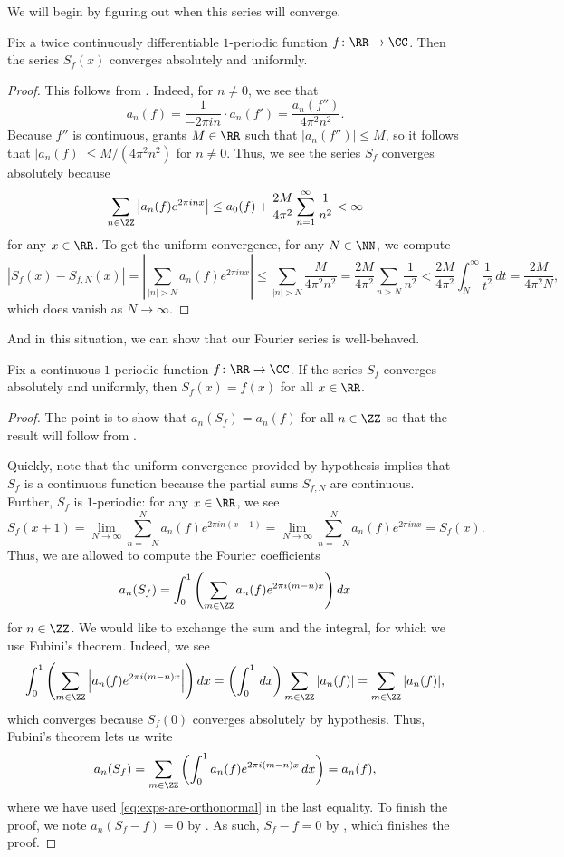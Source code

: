 \documentclass[notes.tex]{subfiles}
\begin{document}
We will begin by figuring out when this series will converge.
\begin{lemma} \label{lem:fourier-series-converges}
	Fix a twice continuously differentiable $1$-periodic function $f\colon\RR\to\CC$. Then the series $S_f(x)$ converges absolutely and uniformly.
\end{lemma}
\begin{proof}
	This follows from . Indeed, for $n\ne0$, we see that
	\[a_n(f)=\frac1{-2\pi in}\cdot a_n(f')=\frac{a_n(f'')}{4\pi^2n^2}.\]
	Because $f''$ is continuous,  grants $M\in\RR$ such that $|a_n(f'')|\le M$, so it follows that $|a_n(f)|\le M/\left(4\pi^2n^2\right)$ for $n\ne0$. Thus, we see the series $S_f$ converges absolutely because
	\[\sum_{n\in\ZZ}\left|a_n(f)e^{2\pi inx}\right|\le a_0(f)+\frac{2M}{4\pi^2}\sum_{n=1}^\infty\frac1{n^2}<\infty\]
	for any $x\in\RR$. To get the uniform convergence, for any $N\in\NN$, we compute
	\[\left|S_f(x)-S_{f,N}(x)\right|=\left|\sum_{|n|>N}a_n(f)e^{2\pi inx}\right|\le\sum_{|n|>N}\frac M{4\pi^2n^2}=\frac{2M}{4\pi^2}\sum_{n>N}\frac1{n^2}<\frac{2M}{4\pi^2}\int_N^\infty\frac1{t^2}\,dt=\frac{2M}{4\pi^2N},\]
	which does vanish as $N\to\infty$.
\end{proof}
And in this situation, we can show that our Fourier series is well-behaved.
\begin{theorem} \label{thm:fourier-series}
	Fix a continuous $1$-periodic function $f\colon\RR\to\CC$. If the series $S_f$ converges absolutely and uniformly, then $S_f(x)=f(x)$ for all $x\in\RR$.
\end{theorem}
\begin{proof}
	The point is to show that $a_n(S_f)=a_n(f)$ for all $n\in\ZZ$ so that the result will follow from .

	Quickly, note that the uniform convergence provided by hypothesis implies that $S_f$ is a continuous function because the partial sums $S_{f,N}$ are continuous. Further, $S_f$ is $1$-periodic: for any $x\in\RR$, we see
	\[S_f(x+1)=\lim_{N\to\infty}\sum_{n=-N}^Na_n(f)e^{2\pi in(x+1)}=\lim_{N\to\infty}\sum_{n=-N}^Na_n(f)e^{2\pi inx}=S_f(x).\]
	Thus, we are allowed to compute the Fourier coefficients
	\[a_n(S_f)=\int_0^1\left(\sum_{m\in\ZZ}a_n(f)e^{2\pi i(m-n)x}\right)dx\]
	for $n\in\ZZ$. We would like to exchange the sum and the integral, for which we use Fubini's theorem. Indeed, we see
	\[\int_0^1\left(\sum_{m\in\ZZ}\left|a_n(f)e^{2\pi i(m-n)x}\right|\right)dx=\left(\int_0^1\,dx\right)\sum_{m\in\ZZ}|a_n(f)|=\sum_{m\in\ZZ}|a_n(f)|,\]
	which converges because $S_f(0)$ converges absolutely by hypothesis. Thus, Fubini's theorem lets us write
	\[a_n(S_f)=\sum_{m\in\ZZ}\left(\int_0^1a_n(f)e^{2\pi i(m-n)x}\,dx\right)=a_n(f),\]
	where we have used \eqref{eq:exps-are-orthonormal} in the last equality. To finish the proof, we note $a_n(S_f-f)=0$ by . As such, $S_f-f=0$ by , which finishes the proof.
\end{proof}
\end{document}
